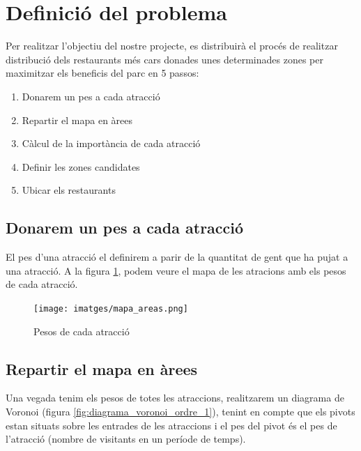 \documentclass[12pt]{article}
\begin{document}
\clearpage
\section{Definició del problema}
Per realitzar l'objectiu del nostre projecte, es distribuirà el procés de realitzar distribució dels restaurants més cars donades unes determinades zones per maximitzar els beneficis del parc en 5 passos:
\begin{enumerate}
	\item Donarem un pes a cada atracció
	\item Repartir el mapa en àrees
	\item Càlcul de la importància de cada atracció
	\item Definir les zones candidates
	\item Ubicar els restaurants
\end{enumerate}

\subsection{Donarem un pes a cada atracció}
El pes d'una atracció el definirem a parir de la quantitat de gent que ha pujat a una atracció. A la figura \ref{fig:mapa_areas}, podem veure el mapa de les atracions amb els pesos de cada atracció.

\begin{figure}[h!]
	\centering
	\texttt{[image: imatges/mapa\_areas.png]}\par\vspace{1cm}
	\caption{Pesos de cada atracció}
	\label{fig:mapa_areas}
\end{figure}

\subsection{Repartir el mapa en àrees}
Una vegada tenim els pesos de totes les atraccions, realitzarem un diagrama de Voronoi (figura \ref{fig:diagrama_voronoi_ordre_1}), tenint en compte que els pivots estan situats sobre les entrades de les atraccions i el pes del pivot és el pes de l’atracció (nombre de visitants en un període de temps).
		
\end{document}
